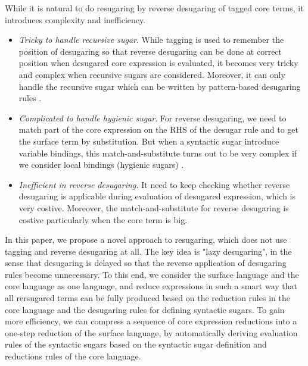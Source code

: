 While it is natural to do resugaring by reverse desugaring of tagged core terms, it introduces complexity and inefficiency.
\begin{itemize}
\item {\em Tricky to handle recursive sugar}. While tagging is used to remember the position of desugaring so that reverse desugaring can be done at correct position when desugared core expression is evaluated, it  becomes very tricky and complex when recursive sugars are considered. Moreover, it can only handle the recursive sugar which can be written by pattern-based desugaring rules \cite{resugaring}.%

\item {\em Complicated to handle hygienic sugar}. For reverse desugaring, we need to match part of the core expression on the RHS of the desugar rule and to get the surface term by substitution. But when a syntactic sugar introduce variable bindings, this match-and-substitute turns out to be very complex if we consider local bindings (hygienic sugars) \cite{hygienic}.

\item {\em Inefficient in reverse desugaring.} It need to keep checking whether reverse desugaring is applicable during evaluation of desugared expression, which is very costive. Moreover, the match-and-substitute for reverse desugaring is costive particularly when the core term is big.

\end{itemize}

In this paper, we propose a novel approach to resugaring, which does not use tagging and reverse desugaring at all.
The key idea is "lazy desugaring", in the sense that desugaring is delayed so that the reverse application of desugaring rules become unnecessary.
To this end, we consider the surface language and the core language as one language, and reduce expressions in such a smart way that all rersugared terms can be fully produced based on the reduction rules in the core language and  the desugaring rules for defining syntactic sugars. To gain more efficiency, we can compress a sequence of core expression reductions into a one-step reduction of the surface language, by automatically deriving evaluation rules of the syntactic sugars based on the syntactic sugar definition and reductions rules of the core language.


